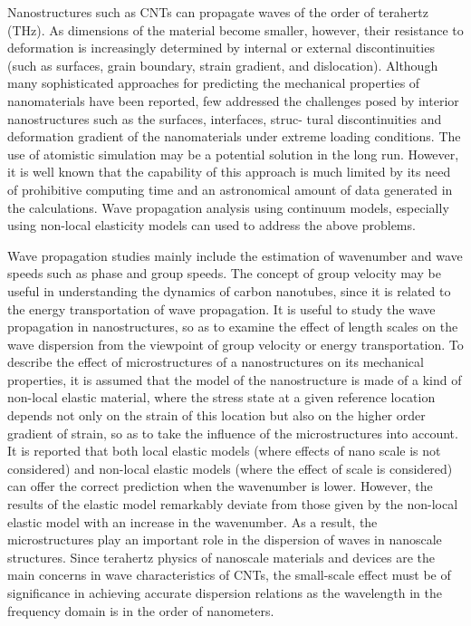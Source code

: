 Nanostructures such as CNTs can propagate waves of the order of terahertz (THz). As dimensions of the material become smaller, however, their resistance to deformation is increasingly determined by internal or external discontinuities (such as surfaces, grain boundary, strain
gradient, and dislocation). Although many sophisticated approaches for predicting
the mechanical properties of nanomaterials have been reported, few addressed the
challenges posed by interior nanostructures such as the surfaces, interfaces, struc-
tural discontinuities and deformation gradient of the nanomaterials under extreme
loading conditions. The use of atomistic simulation may be a potential solution in
the long run. However, it is well known that the capability of this approach is much
limited by its need of prohibitive computing time and an astronomical amount of data
generated in the calculations. Wave propagation analysis using continuum models,
especially using non-local elasticity models can used to address the above problems.

Wave propagation studies mainly include the estimation of wavenumber and wave
speeds such as phase and group speeds. The concept of group velocity may be useful
in understanding the dynamics of carbon nanotubes, since it is related to the energy
transportation of wave propagation. It is useful to study the
wave propagation in nanostructures, so as to examine the effect of length scales on
the wave dispersion from the viewpoint of group velocity or energy transportation. To
describe the effect of microstructures of a nanostructures on its mechanical properties,
it is assumed that the model of the nanostructure is made of a kind of non-local elastic
material, where the stress state at a given reference location depends not only on the
strain of this location but also on the higher order gradient of strain, so as to take
the influence of the microstructures into account. It is reported that both local elastic
models (where effects of nano scale is not considered) and non-local elastic models
(where the effect of scale is considered) can offer the correct prediction when the
wavenumber is lower. However, the results of the elastic model remarkably deviate
from those given by the non-local elastic model with an increase in the wavenumber.
As a result, the microstructures play an important role in the dispersion of waves in
nanoscale structures. Since terahertz physics of nanoscale materials and devices are
the main concerns in wave characteristics of CNTs, the small-scale effect must be
of significance in achieving accurate dispersion relations as the wavelength in the
frequency domain is in the order of nanometers.
